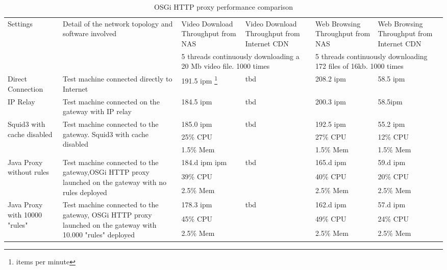 \begin{table*}
	\centering
	\begin{tabular}{|p{}|p{}||p{}|p{}|p{}|p{}|}
		\hline
		\multirow{2}{0.10\textwidth}{Settings} & \multirow{2}{0.35\textwidth}{Detail of the network topology and software involved}   & Video Download Throughput from NAS       & Video Download Throughput from Internet CDN      & Web Browsing Throughput from NAS & Web Browsing Throughput from Internet CDN \\ \cline{3-6}
		 & & \multicolumn{2}{m{0.20\textwidth}|}{5 threads continuously downloading a 20 Mb video file. 1000 times} & \multicolumn{2}{m{0.20\textwidth}|}{5 threads continuously downloading 172 files of 16kb. 1000 times}\\\hline\hline
		Direct Connection & Test machine connected directly to Internet & 191.5 ipm \footnote{items per minute} & tbd & 208.2 ipm & 58.5 ipm \\\hline
		IP Relay  & Test machine connected on the gateway with IP relay & 184.5 ipm & tbd & 200.3 ipm & 58.5ipm\\\hline
		\multirow{3}{0.10\textwidth}{Squid3 with cache disabled} & \multirow{3}{0.35\textwidth}{
		Test machine connected to the gateway. Squid3 with cache disabled} &185.0 ipm & \multirow{3}{*}{tbd} & 192.5 ipm & 55.2 ipm \\
		 & & 25\% CPU & & 27\% CPU & 12\% CPU \\
		 & & 1.5\% Mem & & 1.5\% Mem & 1.5\% Mem \\\hline
		
		\multirow{3}{0.10\textwidth}{Java Proxy without rules} & \multirow{3}{0.35\textwidth}{
		Test machine connected to the gateway,OSGi HTTP proxy launched on the gateway with no rules deployed} &184.d ipm ipm & \multirow{3}{*}{tbd} & 165.d ipm & 59.d ipm \\
		 & & 39\% CPU & & 40\% CPU & 20\% CPU \\
		 & & 2.5\% Mem & & 2.5\% Mem & 2.5\% Mem \\\hline
		 
		 \multirow{3}{0.10\textwidth}{Java Proxy with 10000 "rules"} & \multirow{3}{0.35\textwidth}{
		Test machine connected to the gateway, OSGi HTTP proxy launched on the gateway with 10.000 "rules" deployed} &178.3 ipm & \multirow{3}{*}{tbd} & 162.d ipm & 57.d ipm \\
		 & & 45\% CPU & & 49\% CPU & 24\% CPU \\
		 & & 2.5\% Mem & & 2.5\% Mem & 2.5\% Mem \\\hline
                                                
	\end{tabular}
	\caption{
	OSGi HTTP proxy performance comparison
	\label{tab:perf-comparison}
	}
	
\end{table*}


